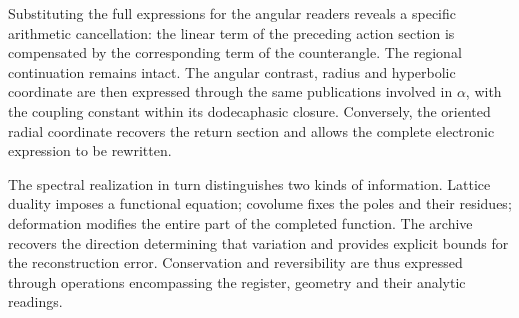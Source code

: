 Substituting the full expressions for the angular readers reveals a specific arithmetic cancellation: the linear term of the preceding action section is compensated by the corresponding term of the counterangle. The regional continuation remains intact. The angular contrast, radius and hyperbolic coordinate are then expressed through the same publications involved in \(\alpha\), with the coupling constant within its dodecaphasic closure. Conversely, the oriented radial coordinate recovers the return section and allows the complete electronic expression to be rewritten.

The spectral realization in turn distinguishes two kinds of information. Lattice duality imposes a functional equation; covolume fixes the poles and their residues; deformation modifies the entire part of the completed function. The archive recovers the direction determining that variation and provides explicit bounds for the reconstruction error. Conservation and reversibility are thus expressed through operations encompassing the register, geometry and their analytic readings.

\HMTMathematicalPaper
